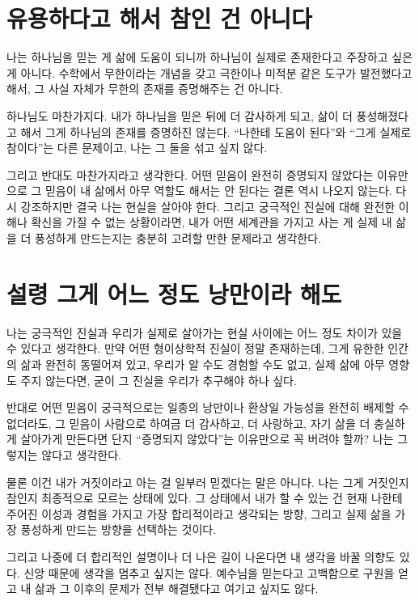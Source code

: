 \documentclass[11pt]{article}
\begin{document}
\section{유용하다고 해서 참인 건 아니다}

나는 하나님을 믿는 게 삶에 도움이 되니까 하나님이 실제로 존재한다고 주장하고
싶은 게 아니다. 수학에서 무한이라는 개념을 갖고 극한이나 미적분 같은
도구가 발전했다고 해서, 그 사실 자체가 무한의 존재를 증명해주는 건 아니다.

하나님도 마찬가지다. 내가 하나님을 믿은 뒤에 더 감사하게 되고, 삶이 더
풍성해졌다고 해서 그게 하나님의 존재를 증명하진 않는다. “나한테 도움이
된다”와 “그게 실제로 참이다”는 다른 문제이고, 나는 그 둘을 섞고 싶지 않다.

그리고 반대도 마찬가지라고 생각한다. 어떤 믿음이 완전히 증명되지 않았다는
이유만으로 그 믿음이 내 삶에서 아무 역할도 해서는 안 된다는 결론 역시 나오지
않는다. 다시 강조하지만 결국 나는 현실을 살아야 한다. 그리고 궁극적인 진실에
대해 완전한 이해나 확신을 가질 수 없는 상황이라면, 내가 어떤 세계관을 가지고
사는 게 실제 내 삶을 더 풍성하게 만드는지는 충분히 고려할 만한 문제라고
생각한다.

\section{설령 그게 어느 정도 낭만이라 해도}

나는 궁극적인 진실과 우리가 실제로 살아가는 현실 사이에는 어느 정도 차이가 있을
수 있다고 생각한다. 만약 어떤 형이상학적 진실이 정말 존재하는데, 그게 유한한
인간의 삶과 완전히 동떨어져 있고, 우리가 알 수도 경험할 수도 없고, 실제 삶에
아무 영향도 주지 않는다면, 굳이 그 진실을 우리가 추구해야 하나 싶다.

반대로 어떤 믿음이 궁극적으로는 일종의 낭만이나 환상일 가능성을 완전히 배제할
수 없더라도, 그 믿음이 사람으로 하여금 더 감사하고, 더 사랑하고, 자기 삶을 더
충실하게 살아가게 만든다면 단지 “증명되지 않았다”는 이유만으로 꼭 버려야 할까?
나는 그렇지는 않다고 생각한다.

물론 이건 내가 거짓이라고 아는 걸 일부러 믿겠다는 말은 아니다. 나는 그게
거짓인지 참인지 최종적으로 모르는 상태에 있다. 그 상태에서 내가 할 수 있는 건
현재 나한테 주어진 이성과 경험을 가지고 가장 합리적이라고 생각되는 방향, 그리고
실제 삶을 가장 풍성하게 만드는 방향을 선택하는 것이다.

그리고 나중에 더 합리적인 설명이나 더 나은 길이 나온다면 내 생각을 바꿀 의향도
있다. 신앙 때문에 생각을 멈추고 싶지는 않다. 예수님을 믿는다고 고백함으로
구원을 얻고 내 삶과 그 이후의 문제가 전부 해결됐다고 여기고 싶지도 않다.
\end{document}
